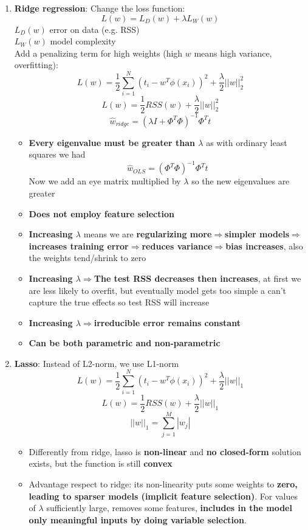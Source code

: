     \begin{enumerate}
        \item \textbf{Ridge regression}:
        Change the loss function:
        $$L(w)=L_D(w)+\lambda L_W(w)$$
        $L_D(w)$ error on data (e.g. RSS)\\
        $L_W(w)$ model complexity\\
        Add a penalizing term for high weights (high $w$ means high variance, overfitting):
        $$L(w)=\frac{1}{2}\sum_{i=1}^N(t_i-w^T\phi(x_i))^2+\frac{\lambda}{2}||w||_2^2$$
        $$L(w)=\frac{1}{2}RSS(w)+\frac{\lambda}{2}||w||_2^2$$
        $$\hat{w}_{ridge}=(\lambda I+\Phi^T\Phi)^{-1}\Phi^Tt$$
        \begin{itemize}
            \item \textbf{Every eigenvalue must be greater than $\lambda$} as with ordinary least squares we had
            $$\hat{w}_{OLS}=(\Phi^T\Phi)^{-1}\Phi^Tt$$
            Now we add an eye matrix multiplied by $\lambda$ so the new eigenvalues are greater
            \item \textbf{Does not employ feature selection}
            \item \textbf{Increasing $\lambda$} means we are \textbf{regularizing more$\Rightarrow$simpler models$\Rightarrow$increases training error$\Rightarrow$reduces variance$\Rightarrow$bias increases}, also the weights tend/shrink to zero
            \item \textbf{Increasing $\lambda\Rightarrow$The test RSS decreases then increases}, at first we are less likely to overfit, but eventually model gets too simple a can't capture the true effects so test RSS will increase
            \item \textbf{Increasing $\lambda\Rightarrow$irreducible error remains constant}
            \item \textbf{Can be both parametric and non-parametric}
        \end{itemize}
        \item \textbf{Lasso}:
        Instead of L2-norm, we use L1-norm
        $$L(w)=\frac{1}{2}\sum_{i=1}^N(t_i-w^T\phi(x_i))^2+\frac{\lambda}{2}||w||_1$$
        $$L(w)=\frac{1}{2}RSS(w)+\frac{\lambda}{2}||w||_1$$
        $$||w||_1=\sum_{j=1}^M|w_j|$$
        \begin{itemize}
            \item Differently from ridge, lasso is \textbf{non-linear} and \textbf{no closed-form} solution exists, but the function is still \textbf{convex}
            \item Advantage respect to ridge: its non-linearity puts some weights to \textbf{zero, leading to sparser models (implicit feature selection)}. For values of $\lambda$ sufficiently large, removes some features, \textbf{includes in the model only meaningful inputs by doing variable selection}.\\

\end{itemize}
\end{enumerate}

